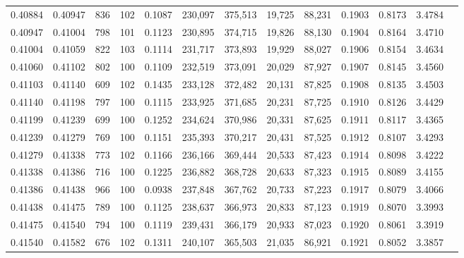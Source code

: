 \begin{tabular}{rrrrrrrrrrrrr}
0.40884 & 0.40947 &   836 & 102 &                                     0.1087 & 230,097 & 375,513 &  19,725 &  88,231 & 0.1903 & 0.8173 & 3.4784 \\
0.40947 & 0.41004 &   798 & 101 &                                     0.1123 & 230,895 & 374,715 &  19,826 &  88,130 & 0.1904 & 0.8164 & 3.4710 \\
0.41004 & 0.41059 &   822 & 103 &                                     0.1114 & 231,717 & 373,893 &  19,929 &  88,027 & 0.1906 & 0.8154 & 3.4634 \\
0.41060 & 0.41102 &   802 & 100 &                                     0.1109 & 232,519 & 373,091 &  20,029 &  87,927 & 0.1907 & 0.8145 & 3.4560 \\
0.41103 & 0.41140 &   609 & 102 &                                     0.1435 & 233,128 & 372,482 &  20,131 &  87,825 & 0.1908 & 0.8135 & 3.4503 \\
0.41140 & 0.41198 &   797 & 100 &                                     0.1115 & 233,925 & 371,685 &  20,231 &  87,725 & 0.1910 & 0.8126 & 3.4429 \\
0.41199 & 0.41239 &   699 & 100 &                                     0.1252 & 234,624 & 370,986 &  20,331 &  87,625 & 0.1911 & 0.8117 & 3.4365 \\
0.41239 & 0.41279 &   769 & 100 &                                     0.1151 & 235,393 & 370,217 &  20,431 &  87,525 & 0.1912 & 0.8107 & 3.4293 \\
0.41279 & 0.41338 &   773 & 102 &                                     0.1166 & 236,166 & 369,444 &  20,533 &  87,423 & 0.1914 & 0.8098 & 3.4222 \\
0.41338 & 0.41386 &   716 & 100 &                                     0.1225 & 236,882 & 368,728 &  20,633 &  87,323 & 0.1915 & 0.8089 & 3.4155 \\
0.41386 & 0.41438 &   966 & 100 &                                     0.0938 & 237,848 & 367,762 &  20,733 &  87,223 & 0.1917 & 0.8079 & 3.4066 \\
0.41438 & 0.41475 &   789 & 100 &                                     0.1125 & 238,637 & 366,973 &  20,833 &  87,123 & 0.1919 & 0.8070 & 3.3993 \\
0.41475 & 0.41540 &   794 & 100 &                                     0.1119 & 239,431 & 366,179 &  20,933 &  87,023 & 0.1920 & 0.8061 & 3.3919 \\
0.41540 & 0.41582 &   676 & 102 &                                     0.1311 & 240,107 & 365,503 &  21,035 &  86,921 & 0.1921 & 0.8052 & 3.3857 \\

\end{tabular}
